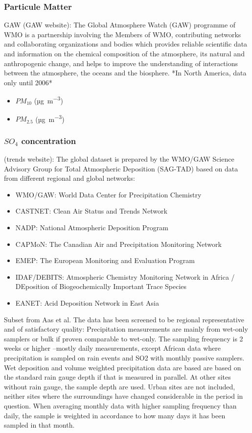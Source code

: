 \documentclass[journal abbreviation, manuscript]{copernicus}
\begin{document}
\subsubsection{Particule Matter}
GAW (GAW website): The Global Atmosphere Watch (GAW) programme of WMO is a partnership involving the Members of WMO, contributing networks and collaborating organizations and bodies which provides reliable scientific data and information on the chemical composition of the atmosphere, its natural and anthropogenic change, and helps to improve the understanding of interactions between the atmosphere, the oceans and the biosphere.
*In North America, data only until 2006*
\begin{itemize}
 \item $PM_{10}$ (\unit{µg.m^{-3}})
 \item $PM_{2.5}$ (\unit{µg.m^{-3}})
\end{itemize}

\subsubsection{$SO_{4}$ concentration}
(trends website): The global dataset is prepared by the WMO/GAW Science Advisory Group for Total Atmospheric Deposition (SAG-TAD) based on data from different regional and global networks:
\begin{itemize}
 \item WMO/GAW: World Data Center for Precipitation Chemistry
 \item CASTNET: Clean Air Status and Trends Network
 \item NADP: National Atmospheric Deposition Program
 \item CAPMoN: The Canadian Air and Precipitation Monitoring Network
 \item EMEP: The European Monitoring and Evaluation Program
 \item IDAF/DEBITS: Atmospheric Chemistry Monitoring Network in Africa / DEposition of Biogeochemically Important Trace Species
 \item EANET: Acid Deposition Network in East Asia
\end{itemize}

Subset from Aas et al.
The data has been screened to be regional representative and of satisfactory quality:
Precipitation measurements are mainly from wet-only samplers or bulk if proven comparable to wet-only.
The sampling frequency is 2 weeks or higher –mostly daily measurements, except African data where precipitation is sampled on rain events and SO2 with monthly passive samplers.
Wet deposition and volume weighted precipitation data are based are based on the standard rain gauge depth if that is measured in parallel. At other sites without rain gauge, the sample depth are used.
Urban sites are not included, neither sites where the surroundings have changed considerable in the period in question.
When averaging monthly data with higher sampling frequency than daily, the sample is weighted in accordance to how many days it has been sampled in that month.
\end{document}
